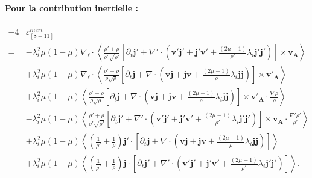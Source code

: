 \paragraph{Pour la contribution inertielle :} 
\begin{equation}\begin{array}{rl}
  \label{eq:turb_bin_TEMN} - 4&  \varepsilon^{inert}_{[8-11]} \\
    =&- \lambda_i^2\mu \left(1-\mu\right)\nabla_{\boldsymbol{\ell}} \cdot \left< \frac{\rho' + \rho}{\rho'\sqrt{\rho'}} \left[\partial_t \boldsymbol{j'} + \nabla' \cdot \left( \boldsymbol{v'}  \boldsymbol{j'}  + \boldsymbol{j'}  \boldsymbol{v'} +\frac{ \left(2\mu -1 \right)}{\rho'} \lambda_i  \boldsymbol{j'} \boldsymbol{j'}   \right)\right]\times \boldsymbol{v_A}  \right>\\%
  &+ \lambda_i^2\mu \left(1-\mu\right) \nabla_{\boldsymbol{\ell}} \cdot \left< \frac{\rho' + \rho}{\rho\sqrt{\rho}} \left[\partial_t \boldsymbol{j} +\nabla \cdot \left( \boldsymbol{v}  \boldsymbol{j}   + \boldsymbol{j}  \boldsymbol{v} +\frac{ \left(2\mu -1 \right)}{\rho} \lambda_i  \boldsymbol{j} \boldsymbol{j} \right)\right]\times \boldsymbol{v'_A}  \right>  \\%
  &+ \lambda_i^2\mu \left(1-\mu\right)\left<\frac{\rho' + \rho}{\rho\sqrt{\rho}} \left[\partial_t \boldsymbol{j} +\nabla \cdot \left( \boldsymbol{v}  \boldsymbol{j}   + \boldsymbol{j}  \boldsymbol{v} +\frac{ \left(2\mu -1 \right)}{\rho} \lambda_i  \boldsymbol{j} \boldsymbol{j} \right)\right]\times \boldsymbol{v'_A}  \cdot \frac{\nabla  \rho }{\rho}\right>  \\%
  &- \lambda_i^2\mu \left(1-\mu\right)\left<\frac{\rho' + \rho}{\rho'\sqrt{\rho'}} \left[\partial_t \boldsymbol{j'} + \nabla' \cdot \left( \boldsymbol{v'}  \boldsymbol{j'}  + \boldsymbol{j'}  \boldsymbol{v'} +\frac{ \left(2\mu -1 \right)}{\rho'} \lambda_i  \boldsymbol{j'} \boldsymbol{j'}   \right)\right]\times \boldsymbol{v_A}  \cdot \frac{\nabla'  \rho' }{\rho'}\right> \\%
         &+ \lambda_i^2\mu \left(1-\mu\right) \left< \left(\frac{1}{\rho'} + \frac{1}{\rho}\right) \boldsymbol{j'} \cdot   \left[\partial_t \boldsymbol{j} +\nabla \cdot \left( \boldsymbol{v}  \boldsymbol{j}   + \boldsymbol{j}  \boldsymbol{v} +\frac{ \left(2\mu -1 \right)}{\rho} \lambda_i  \boldsymbol{j} \boldsymbol{j} \right)\right]\right> \\%
         &+ \lambda_i^2 \mu \left(1-\mu\right) \left<\left(\frac{1}{\rho'} + \frac{1}{\rho}\right) \boldsymbol{j} \cdot \left[\partial_t \boldsymbol{j'} + \nabla' \cdot \left( \boldsymbol{v'}  \boldsymbol{j'}  + \boldsymbol{j'}  \boldsymbol{v'} +\frac{ \left(2\mu -1 \right)}{\rho'} \lambda_i  \boldsymbol{j'} \boldsymbol{j'}   \right)\right]\right>.
\end{array}\end{equation}
